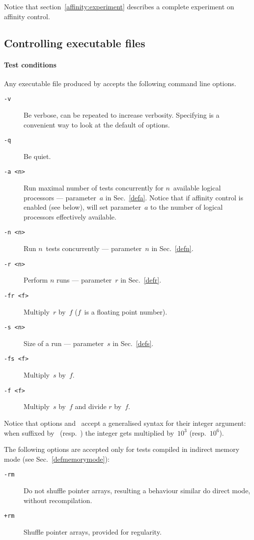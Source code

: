 Notice that section~\ref{affinity:experiment} describes a complete experiment
on affinity control.

\subsection{Controlling\label{exec:control} executable files}

\paragraph{Test conditions}
Any executable file produced by \litmus{} accepts the following
command line options.
\begin{description}
\item[{\tt -v}] Be verbose, can be repeated to increase verbosity.
Specifying  is a convenient way to look at the default of options.
\item[{\tt -q}] Be quiet.
\item[{\tt -a <n>}] Run maximal number of tests concurrently for $n$~available
logical processors --- parameter~$a$ in Sec.~\ref{defa}.
Notice that if affinity control is enabled (see below),  will
set parameter~$a$ to the number of logical processors effectively available. 
\item[{\tt -n <n>}] Run $n$~tests concurrently --- parameter~$n$
in Sec.~\ref{defn}. 
\item[{\tt -r <n>}] Perform $n$ runs --- parameter~$r$ in Sec.~\ref{defr}.
\item[{\tt -fr <f>}] Multiply~$r$ by~$f$ ($f$~is a floating point number).
\item[{\tt -s <n>}] Size of a run --- parameter~$s$ in Sec.~\ref{defs}.
\item[{\tt -fs <f>}] Multiply~$s$ by~$f$.
\item[{\tt -f <f>}] Multiply~$s$ by~$f$ and divide $r$ by~$f$.
\end{description}
\label{generalized:integer}Notice that options  and~
accept a generalised
syntax for their integer argument: when suffixed by~ (resp.~)
the integer gets multiplied by~$10^3$ (resp.~$10^6$).

\label{rm}The following options are accepted only for tests compiled
in indirect memory mode (see Sec.~\ref{defmemorymode}):
\begin{description}
\item[{\tt -rm}] Do not shuffle pointer arrays, resulting a behaviour
similar do direct mode, without recompilation.
\item[{\tt +rm}] Shuffle pointer arrays, provided for regularity.
\end{description}

